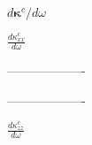 \documentclass[twocolumn,amsmath,amssymb,a4paper,prb,superscriptaddress,floatfix]{revtex4-1}
\begin{document}
{\Huge $d\boldsymbol{\kappa}^c/d\omega$}



{\Huge $\frac{d\kappa^c_{xx}}{d\omega}$}

{\Huge -------------------}



{\Huge -------------------}


{\Huge $\frac{d\kappa^c_{zz}}{d\omega}$}
\end{document}
